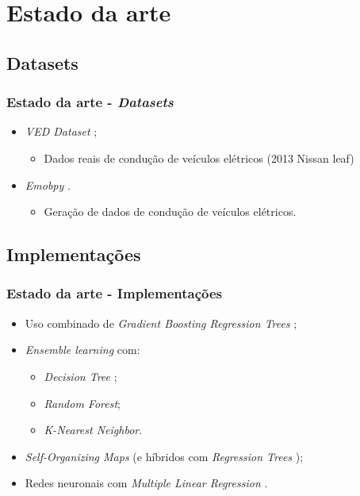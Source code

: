 \documentclass{beamer}
\begin{document}
\section[Estado da arte]{Estado da arte}
\subsection[Datasets]{Datasets}
\begin{frame}
\frametitle{Estado da arte - \textit{Datasets}}

\begin{itemize}
	\item \textit{VED Dataset} ;
		  \begin{itemize}
			  \item Dados reais de condução de veículos elétricos (2013 Nissan leaf)  
		  \end{itemize}
	\item \textit{Emobpy} .
		  \begin{itemize}
			  \item Geração de dados de condução de veículos elétricos.
		  \end{itemize}
\end{itemize}

\end{frame}

\subsection[Implementacoes]{Implementações}
\begin{frame}[label={Implementacoes}]
\frametitle{Estado da arte - Implementações}

\let\oldfootnotesize\footnotesize
\renewcommand*{\footnotesize}{\oldfootnotesize\tiny}

\begin{itemize}
	\item Uso combinado de \textit{Gradient Boosting Regression Trees}
		  ;
	\item \textit{Ensemble learning}  com: 
		  \begin{itemize}
			  \item \textit{Decision Tree };
			  \item \textit{Random Forest};
			  \item \textit{K-Nearest Neighbor}.
		  \end{itemize}
	\item \textit{Self-Organizing Maps} 
		  (e híbridos com \textit{Regression Trees} );
	\item Redes neuronais com \textit{Multiple Linear Regression} 
		  .
\end{itemize}

\renewcommand*{\footnotesize}{\oldfootnotesize}

\end{frame}
\end{document}

